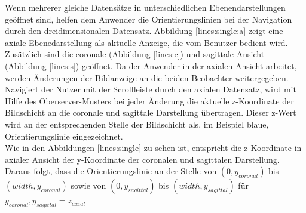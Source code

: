 Wenn mehrerer gleiche Datensätze in unterschiedlichen Ebenendarstellungen geöffnet sind, helfen dem Anwender die Orientierungslinien bei der Navigation durch den dreidimensionalen Datensatz. Abbildung \ref{lines:single:a} zeigt eine axiale Ebenedarstellung als aktuelle Anzeige, die vom Benutzer bedient wird. Zusätzlich sind die coronale (Abbildung \ref{lines:c}) und sagittale Ansicht (Abbildung \ref{lines:s}) geöffnet. Da der Anwender in der axialen Ansicht arbeitet, werden Änderungen der Bildanzeige an die beiden Beobachter weitergegeben.\\
Navigiert der Nutzer mit der Scrollleiste durch den axialen Datensatz, wird mit Hilfe des Oberserver-Musters bei jeder Änderung die aktuelle z-Koordinate der Bildschicht an die coronale und sagittale Darstellung übertragen. Dieser z-Wert wird an der entsprechenden Stelle der Bildschicht als, im Beispiel blaue, Orientierungslinie eingezeichnet. \\
Wie in den Abbildungen \ref{lines:single} zu sehen ist, entspricht die z-Koordinate in axialer Ansicht der y-Koordinate der coronalen und sagittalen Darstellung. Daraus folgt, dass die Orientierungslinie an der Stelle von $(0, y_{coronal}) $ bis $(width, y_{coronal})$ sowie von $(0, y_{sagittal}) $ bis $(width, y_{sagittal})$ für $y_{coronal}, y_{sagittal} = z_{axial}$

